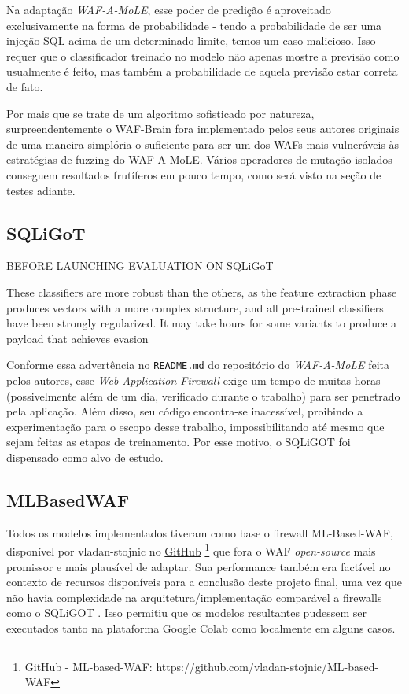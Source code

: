 Na adaptação \textit{WAF-A-MoLE}, esse poder de predição é aproveitado exclusivamente na forma de probabilidade - tendo a probabilidade de ser uma injeção SQL acima de um determinado limite, temos um caso malicioso. Isso requer que o classificador treinado no modelo não apenas mostre a previsão como usualmente é feito, mas também a probabilidade de aquela previsão estar correta de fato.

Por mais que se trate de um algoritmo sofisticado por natureza, surpreendentemente o WAF-Brain fora implementado pelos seus autores originais de uma maneira simplória o suficiente para ser um dos WAFs mais vulneráveis às estratégias de fuzzing do WAF-A-MoLE. Vários operadores de mutação isolados conseguem resultados frutíferos em pouco tempo, como será visto na seção de testes adiante.

\subsection{SQLiGoT}

\begin{citacao}[english]
BEFORE LAUNCHING EVALUATION ON SQLiGoT

These classifiers are more robust than the others, as the feature extraction phase produces vectors with a more complex structure, and all pre-trained classifiers have been strongly regularized. It may take hours for some variants to produce a payload that achieves evasion
\end{citacao}
\bigskip

Conforme essa advertência no \verb+README.md+ do repositório do \textit{WAF-A-MoLE} feita pelos autores, esse \textit{Web Application Firewall} exige um tempo de muitas horas (possivelmente além de um dia, verificado durante o trabalho) para ser penetrado pela aplicação. Além disso, seu código encontra-se inacessível, proibindo a experimentação para o escopo desse trabalho, impossibilitando até mesmo que sejam feitas as etapas de treinamento. Por esse motivo, o SQLiGOT \cite{kar2016sqligot} foi dispensado como alvo de estudo.

\subsection{MLBasedWAF}
Todos os modelos implementados tiveram como base o firewall ML-Based-WAF, disponível por vladan-stojnic no \href{https://github.com/vladan-stojnic/ML-based-WAF}{GitHub} \footnote{GitHub - ML-based-WAF: https://github.com/vladan-stojnic/ML-based-WAF} \cite{ml_based_waf} que fora o WAF \textit{open-source} mais promissor e mais plausível de adaptar. Sua performance também era factível no contexto de recursos disponíveis para a conclusão deste projeto final, uma vez que não havia complexidade na arquitetura/implementação comparável a firewalls como o SQLiGOT \cite{kar2016sqligot}. Isso permitiu que os modelos resultantes pudessem ser executados tanto na plataforma Google Colab como localmente em alguns casos.

